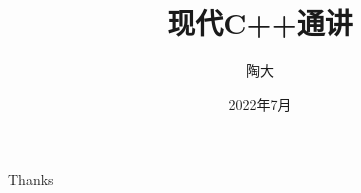 \documentclass[UTF8,lualatex]{ctexbeamer}
\title{\kaishu 现代C++通讲}
\author{陶大}
\date{2022年7月}
\begin{document}
\songti

\begin{frame}[plain]
    \titlepage
\end{frame}

\begin{frame}[plain]
    \tableofcontents
\end{frame}

\AtBeginSubsection

\section{}

\begin{frame}
    \frametitle{}
\end{frame}

\begin{frame}[plain]
    \Huge
    \begin{center}
        Thanks
    \end{center}
\end{frame}
\end{document}
